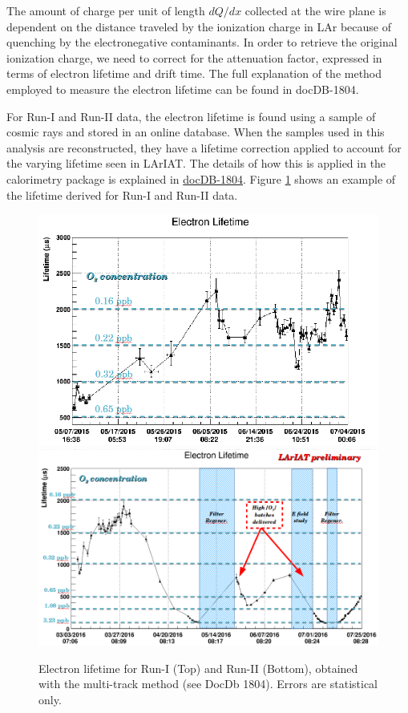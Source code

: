 The amount of charge per unit of length $dQ/dx$ collected at the wire plane is dependent on the distance traveled by the ionization charge in LAr because of quenching by the electronegative contaminants. In order to retrieve the original ionization charge, we need to correct for the attenuation factor, expressed in terms of electron lifetime and drift time. The full explanation of the method employed to measure the electron lifetime can be found in docDB-1804.

For Run-I and Run-II data, the electron lifetime is found using a sample of cosmic rays and stored in an online database. When the samples used in this analysis are reconstructed, they have a lifetime correction applied to account for the varying lifetime seen in LArIAT. The details of how this is applied in the calorimetry package is explained in \href{https://lartpc-docdb.fnal.gov:441/cgi-bin/ShowDocument?docid=1804}{docDB-1804}. Figure \ref{fig:LifetimeNOchargecorrection} shows an example of the lifetime derived for Run-I and Run-II data.

\begin{figure}[h!]
\centering
\includegraphics[scale=0.35]{./images/Run1Lifetime.png}
\includegraphics[scale=0.28]{./images/Run2Lifetime.png}
\caption{Electron lifetime for Run-I (Top) and Run-II (Bottom), obtained with the multi-track method (see DocDb 1804). Errors are statistical only.}
\label{fig:LifetimeNOchargecorrection}
\end{figure}

